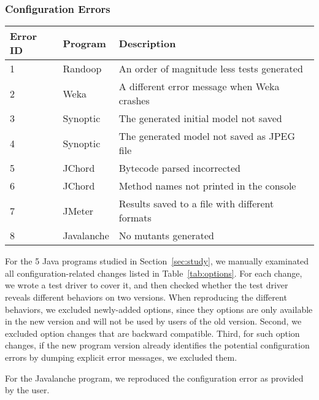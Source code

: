 \subsubsection{Configuration Errors}

\begin{table}[t]
\vspace{1mm}
\centering
\small{
\setlength{\tabcolsep}{.80\tabcolsep}
\begin{tabular}{|l||l|l|}
\hline
 Error ID& Program & Description\\
 \hline
 \hline
 1 & Randoop  & An order of magnitude less tests generated \\
 2 & Weka &  A different error message when Weka crashes\\
 3 & Synoptic & The generated initial model not saved\\
 4 & Synoptic & The generated model not saved as JPEG file \\
 5 & JChord & Bytecode parsed incorrected \\
 6 & JChord &  Method names not printed in the console\\
 7 & JMeter &  Results saved to a file with different formats\\
 8 & Javalanche &  No mutants generated\\
\hline
\end{tabular}
}
\vspace{-2mm}
\end{table}



For the 5 Java programs studied in Section~\ref{sec:study},
we manually examinated all configuration-related changes
listed in Table~\ref{tab:options}. For each
change, we wrote a test driver to cover
it, and then checked whether the test driver
reveals different behaviors on two versions.
When reproducing the different behaviors,
we excluded newly-added options, since
they options are only available in the new version
and will not be used by users of the old version.
Second, we excluded option changes that are backward
compatible. Third, for such option changes, if the
new program version already identifies the potential
configuration errors by dumping explicit error messages,
we excluded them. 

For the Javalanche program, we reproduced the configuration
error as provided by the user.

